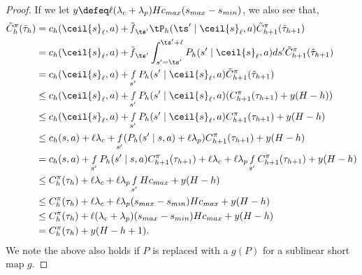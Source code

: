 \documentclass[pdftex, a4paper, 12pt]{article}
\newcommand{\round}[2]{\ceil{#2}_{#1}}
\newcommand{\cmax}{c_{max}}
\newcommand{\tC}{\Tilde{C}}
\newcommand{\smax}{s_{max}}
\newcommand{\smin}{s_{min}}
\DeclareMathOperator*{\f}{\mathit{f}}
\begin{document}
\begin{proof}
    If we let $y \defeq \ell (\lambda_c + \lambda_p)H\cmax(\smax - \smin)$, we also see that,
    \begin{align*}
        \tC^{\pi}_h(\Tilde{\tau}_h) &= c_h(\round{\ell}{s}, a) + \Tilde{\f}_{\ts'}\tP_h(\ts' \mid \round{\ell}{s}, a)\tC^{\pi}_{h+1}(\Tilde{\tau}_{h+1}) \\
        &=  c_h(\round{\ell}{s}, a) + \Tilde{\f}_{\ts'}\int_{s' = \ts'}^{\ts' + \ell}P_h(s' \mid \round{\ell}{s}, a)ds'\tC^{\pi}_{h+1}(\Tilde{\tau}_{h+1}) \\
        &= c_h(\round{\ell}{s}, a) + \f_{s'} P_h(s' \mid \round{\ell}{s}, a)\tC^{\pi}_{h+1}(\Tilde{\tau}_{h+1}) \\
        &\leq c_h(\round{\ell}{s}, a) + \f_{s'} P_h(s' \mid \round{\ell}{s}, a)(C^{\pi}_{h+1}(\tau_{h+1}) + y(H-h)) \\
        &\leq c_h(\round{\ell}{s}, a) + \f_{s'} P_h(s' \mid \round{\ell}{s}, a)C^{\pi}_{h+1}(\tau_{h+1}) + y(H-h) \\
        &\leq c_h(s,a)  + \ell \lambda_c  + \f_{s'} (P_h(s' \mid s,a) + \ell \lambda_p)C_{h+1}^{\pi}(\tau_{h+1}) + y(H-h) \\
        &= c_h(s,a) + \f_{s'} P_h(s' \mid s,a) C_{h+1}^{\pi}(\tau_{h+1}) + \ell \lambda_c + \ell \lambda_p \f_{s'} C_{h+1}^{\pi}(\tau_{h+1}) + y(H-h) \\
        &\leq C_h^{\pi}(\tau_h) + \ell \lambda_c + \ell \lambda_p \f_{s'} H\cmax + y(H-h) \\
        &\leq C_h^{\pi}(\tau_h) + \ell \lambda_c + \ell \lambda_p (\smax - \smin)H\cmax + y(H-h) \\
        &\leq  C_h^{\pi}(\tau_h) + \ell (\lambda_c + \lambda_p) (\smax - \smin)H\cmax + y(H-h) \\
        &=  C_h^{\pi}(\tau_h)  + y(H-h+1).
    \end{align*}
    We note the above also holds if $P$ is replaced with a $g(P)$ for a sublinear short map $g$.


\end{proof}
\end{document}
